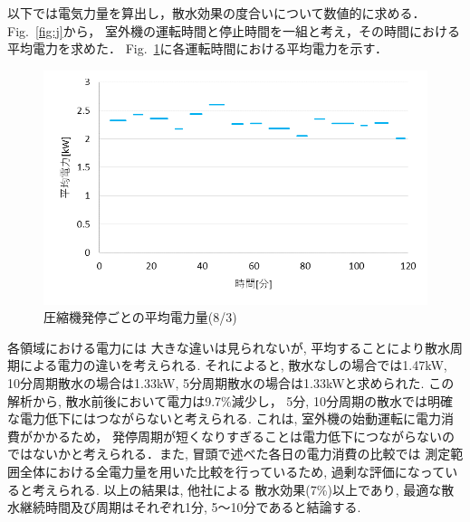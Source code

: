 \documentclass[a4j,fleqn,dvipdfmx,uplatex]{jsarticle}
\newcommand{\figref}[1]{Fig.\ \ref{#1}}
\begin{document}
以下では電気力量を算出し，散水効果の度合いについて数値的に求める．\figref{fig:j}から，
室外機の運転時間と停止時間を一組と考え，その時間における平均電力を求めた．
\figref{fig:8/3_sato}に各運転時間における平均電力を示す．

\begin{figure}[htb]
  \centering
  \includegraphics[width=\linewidth]{img/20220803_peak.png}
  \caption{圧縮機発停ごとの平均電力量(8/3)}
  \label{fig:8/3_sato}
\end{figure}

各領域における電力には
大きな違いは見られないが, 平均することにより散水周期による電力の違いを考えられる. それによると, 散水なしの場合では1.47kW, 
10分周期散水の場合は1.33kW, 5分周期散水の場合は1.33kWと求められた. この解析から, 散水前後において電力は9.7\%減少し，
5分, 10分周期の散水では明確な電力低下にはつながらないと考えられる. これは, 室外機の始動運転に電力消費がかかるため，
発停周期が短くなりすぎることは電力低下につながらないのではないかと考えられる．また, 冒頭で述べた各日の電力消費の比較では
測定範囲全体における全電力量を用いた比較を行っているため, 過剰な評価になっていると考えられる. 以上の結果は, 他社による
散水効果(7\%)以上であり, 最適な散水継続時間及び周期はそれぞれ1分, 5～10分であると結論する. 
\end{document}
